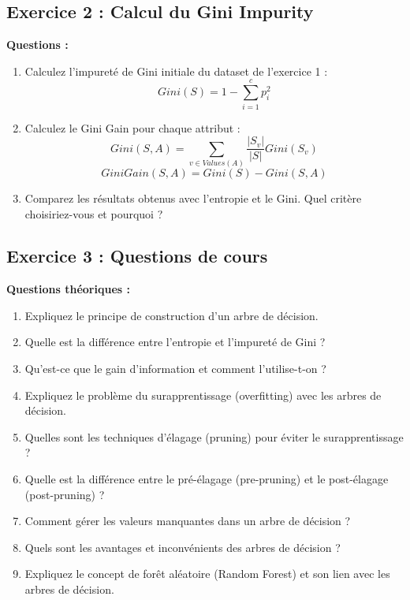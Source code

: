 \documentclass[11pt,a4paper]{article}
\begin{document}
\subsection{Exercice 2 : Calcul du Gini Impurity}

\begin{questionbox}
\textbf{Questions :}
\begin{enumerate}
    \item Calculez l'impureté de Gini initiale du dataset de l'exercice 1 :
    $$Gini(S) = 1 - \sum_{i=1}^{c}p_i^2$$
    
    \item Calculez le Gini Gain pour chaque attribut :
    $$Gini(S, A) = \sum_{v \in Values(A)}\frac{|S_v|}{|S|}Gini(S_v)$$
    $$GiniGain(S, A) = Gini(S) - Gini(S, A)$$
    
    \item Comparez les résultats obtenus avec l'entropie et le Gini. Quel critère choisiriez-vous et pourquoi ?
\end{enumerate}
\end{questionbox}

\subsection{Exercice 3 : Questions de cours}

\begin{questionbox}
\textbf{Questions théoriques :}
\begin{enumerate}
    \item Expliquez le principe de construction d'un arbre de décision.
    
    \item Quelle est la différence entre l'entropie et l'impureté de Gini ?
    
    \item Qu'est-ce que le gain d'information et comment l'utilise-t-on ?
    
    \item Expliquez le problème du surapprentissage (overfitting) avec les arbres de décision.
    
    \item Quelles sont les techniques d'élagage (pruning) pour éviter le surapprentissage ?
    
    \item Quelle est la différence entre le pré-élagage (pre-pruning) et le post-élagage (post-pruning) ?
    
    \item Comment gérer les valeurs manquantes dans un arbre de décision ?
    
    \item Quels sont les avantages et inconvénients des arbres de décision ?
    
    \item Expliquez le concept de forêt aléatoire (Random Forest) et son lien avec les arbres de décision.
\end{enumerate}
\end{questionbox}
\end{document}
